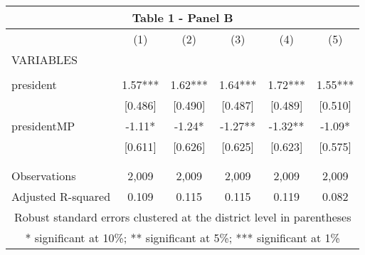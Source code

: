 \begin{tabular}{lccccc}
\multicolumn{6}{c}{Table 1 - Panel B} \\ \hline
 & (1) & (2) & (3) & (4) & (5) \\
VARIABLES &  &  &  &  &  \\ \hline
 &  &  &  &  &  \\
president & 1.57*** & 1.62*** & 1.64*** & 1.72*** & 1.55*** \\
 & [0.486] & [0.490] & [0.487] & [0.489] & [0.510] \\
presidentMP & -1.11* & -1.24* & -1.27** & -1.32** & -1.09* \\
 & [0.611] & [0.626] & [0.625] & [0.623] & [0.575] \\
 &  &  &  &  &  \\
 &  &  &  &  &  \\
Observations & 2,009 & 2,009 & 2,009 & 2,009 & 2,009 \\
 Adjusted R-squared & 0.109 & 0.115 & 0.115 & 0.119 & 0.082 \\ \hline
\multicolumn{6}{c}{ Robust standard errors clustered at the district level in parentheses} \\
\multicolumn{6}{c}{ * significant at 10\%; ** significant at 5\%; *** significant at 1\%} \\
\end{tabular}
